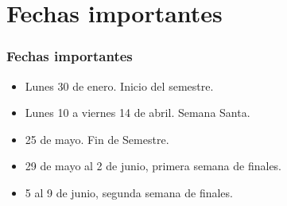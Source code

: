 \documentclass[12pt]{beamer}
\begin{document}
\section{Fechas importantes}
\begin{frame}
\frametitle{Fechas importantes}
\begin{itemize}
\item Lunes 30 de enero. Inicio del semestre.
\item Lunes 10 a viernes 14 de abril. Semana Santa.
\item 25 de mayo. Fin de Semestre.
\item 29 de mayo al 2 de junio, primera semana de finales.
\item 5 al 9 de junio, segunda semana de finales.
\end{itemize}
\end{frame}
\end{document}

